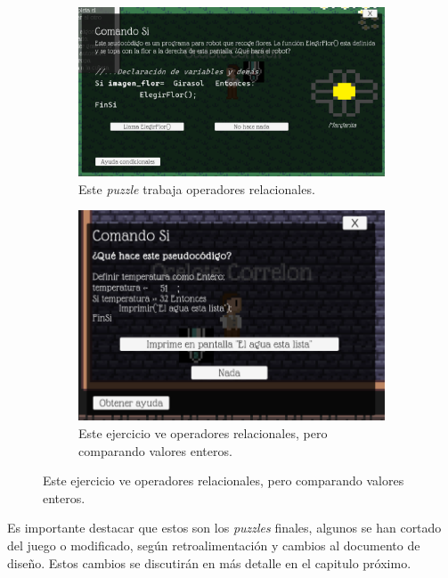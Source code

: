 \begin{itemize}
        \begin{figure}[H]
        \ContinuedFloat
        \centering
        \begin{subfigure}{\textwidth}
            \centering
            \includegraphics[width=0.5\linewidth]{images/Puzzlecondicional3.png}
            \caption{Este \textit{puzzle} trabaja operadores relacionales.}
            \label{fig:puzzle_condicionale3}
        \end{subfigure}
        \begin{subfigure}{\textwidth}
            \centering
            \includegraphics[width=0.5\linewidth]{images/Puzzlecondicional4.png}
            \caption{Este ejercicio ve operadores relacionales, pero comparando valores enteros.}
            \label{fig:puzzle_condicionales4}
        \end{subfigure}
    \end{figure}
\end{itemize}

Es importante destacar que estos son los \textit{puzzles} finales, algunos se han cortado del juego o modificado, según retroalimentación y cambios al documento de diseño. Estos cambios se discutirán en más detalle en el capitulo próximo. 

